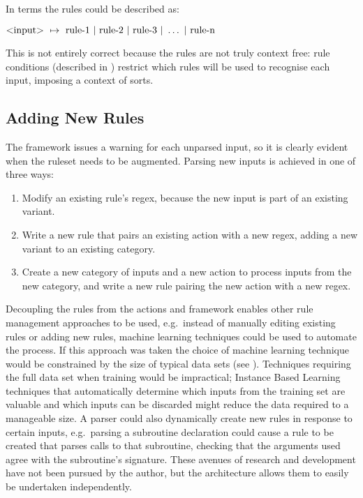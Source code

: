 In  terms the rules could be described as:

$\text{\textless{}input\textgreater{}}~\mapsto{}~\text{rule-1}~|~\text{rule-2}~|~\text{rule-3}~|~\dots~|~\text{rule-n}$

This is not entirely correct because the rules are not truly context free:
rule conditions (described in )
restrict which rules will be used to recognise each input, imposing a
context of sorts.

\subsection{Adding New Rules}

The framework issues a warning for each unparsed input, so it is clearly
evident when the ruleset needs to be augmented.  Parsing new inputs is
achieved in one of three ways:

\begin{enumerate}

    \item Modify an existing rule's regex, because the new input is part of
        an existing variant.

    \item Write a new rule that pairs an existing action with a new regex,
        adding a new variant to an existing category.

    \item Create a new category of inputs and a new action to process
        inputs from the new category, and write a new rule pairing the new
        action with a new regex.

\end{enumerate}

Decoupling the rules from the actions and framework enables other rule
management approaches to be used, e.g.\ instead of manually editing
existing rules or adding new rules, machine learning techniques could be
used to automate the process.  If this approach was taken the choice of
machine learning technique would be constrained by the size of typical data
sets (see ).  Techniques requiring the full
data set when training would be impractical; Instance Based
Learning~\cite{instance-based-learning} techniques that automatically
determine which inputs from the training set are valuable and which inputs
can be discarded might reduce the data required to a manageable size.  A
parser could also dynamically create new rules in response to certain
inputs, e.g.\ parsing a subroutine declaration could cause a rule to be
created that parses calls to that subroutine, checking that the arguments
used agree with the subroutine's signature.  These avenues of research and
development have not been pursued by the author, but the architecture
allows them to easily be undertaken independently.

